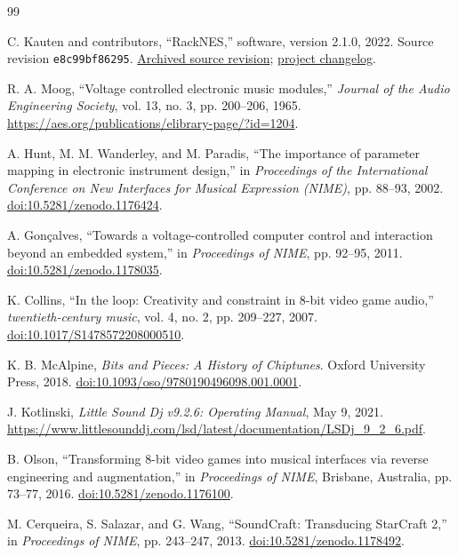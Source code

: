 \documentclass[10pt,letterpaper,twocolumn]{article}
\newcommand{\code}[1]{\texttt{#1}}
\begin{document}
\begin{thebibliography}{99}
\small\raggedright
{}
C. Kauten and contributors, ``RackNES,'' software, version 2.1.0, 2022.
Source revision \code{e8c99bf86295}.
\href{https://github.com/Arhythmetic-Units/RackNES/tree/e8c99bf86295318724ef62ad40a17ba6897be696}{Archived source revision};
\href{https://github.com/Arhythmetic-Units/RackNES/blob/e8c99bf86295318724ef62ad40a17ba6897be696/CHANGELOG.md}{project changelog}.

R. A. Moog, ``Voltage controlled electronic music modules,''
\emph{Journal of the Audio Engineering Society}, vol. 13, no. 3,
pp. 200--206, 1965.
\url{https://aes.org/publications/elibrary-page/?id=1204}.

A. Hunt, M. M. Wanderley, and M. Paradis, ``The importance of parameter mapping
in electronic instrument design,'' in \emph{Proceedings of the International
Conference on New Interfaces for Musical Expression (NIME)}, pp. 88--93, 2002.
\href{https://doi.org/10.5281/zenodo.1176424}{doi:10.5281/zenodo.1176424}.

A. Gon\c{c}alves, ``Towards a voltage-controlled computer control and
interaction beyond an embedded system,'' in \emph{Proceedings of NIME},
pp. 92--95, 2011.
\href{https://doi.org/10.5281/zenodo.1178035}{doi:10.5281/zenodo.1178035}.

K. Collins, ``In the loop: Creativity and constraint in 8-bit video game audio,''
\emph{twentieth-century music}, vol. 4, no. 2, pp. 209--227, 2007.
\href{https://doi.org/10.1017/S1478572208000510}{doi:10.1017/S1478572208000510}.

K. B. McAlpine, \emph{Bits and Pieces: A History of Chiptunes}.
Oxford University Press, 2018.
\href{https://doi.org/10.1093/oso/9780190496098.001.0001}{doi:10.1093/oso/9780190496098.001.0001}.

J. Kotlinski, \emph{Little Sound Dj v9.2.6: Operating Manual}, May 9, 2021.
\url{https://www.littlesounddj.com/lsd/latest/documentation/LSDj_9_2_6.pdf}.

B. Olson, ``Transforming 8-bit video games into musical interfaces via reverse
engineering and augmentation,'' in \emph{Proceedings of NIME},
Brisbane, Australia, pp. 73--77, 2016.
\href{https://doi.org/10.5281/zenodo.1176100}{doi:10.5281/zenodo.1176100}.

M. Cerqueira, S. Salazar, and G. Wang, ``SoundCraft: Transducing StarCraft 2,''
in \emph{Proceedings of NIME}, pp. 243--247, 2013.
\href{https://doi.org/10.5281/zenodo.1178492}{doi:10.5281/zenodo.1178492}.


\end{thebibliography}
\end{document}
